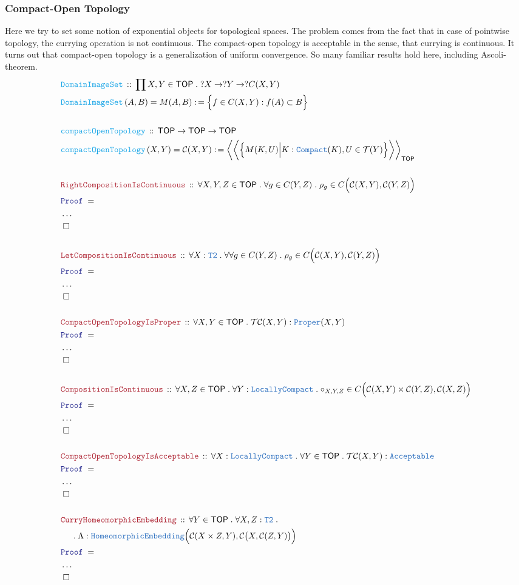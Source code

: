 \documentclass[12pt]{scrartcl}
\newcommand{\TYPE}[1]{\textcolor{NavyBlue}{\mathtt{#1}}}
\newcommand{\FUNC}[1]{\textcolor{Cerulean}{\mathtt{#1}}}
\newcommand{\LOGIC}[1]{\textcolor{Blue}{\mathtt{#1}}}
\newcommand{\THM}[1]{\textcolor{Maroon}{\mathtt{#1}}}
\renewcommand{\.}{\; . \;}
\newcommand{\de}{: \kern 0.1pc =}
\newcommand{\Act}[1]{\left( #1 \right)}
\newcommand{\Theorem}[2]{& \THM{#1} \, :: \, #2 \\ & \Proof = \\ }
\newcommand{\DeclareFunc}[2]{& \FUNC{#1} \, :: \, #2 \\}
\newcommand{\DefineNamedFunc}[4]{&  \FUNC{#1}\Act{#2} = #3 \de #4 \\}
\newcommand{\NewLine}{\\ & \kern 1pc}
\newcommand{\Page}[1]{ \begin{align*} #1 \end{align*}   }
\newcommand{\NoProof}{ & \ldots \\ \EndProof}
\newcommand{\QED}{\; \square}
\newcommand{\EndProof}{& \QED \\}
\newcommand{\Proof}{\LOGIC{Proof} \; }
\newcommand{\C}{\mathcal{C}}
\newcommand{\TOP}{\mathsf{TOP}}
\newcommand{\T}{\mathcal{T}}
\begin{document}
\subsubsection{Compact-Open Topology}
Here we try to set some notion of exponential objects for topological spaces.
The problem comes from the fact that in case of pointwise topology,
the currying operation is not continuous.
The compact-open topology is acceptable in the sense,
that currying is continuous.
It turns out that compact-open topology is a generalization of uniform convergence.
So many familiar results hold here, including Ascoli-theorem.
\Page{
	\DeclareFunc{DomainImageSet}{ \prod X,Y \in \TOP \. ?X \to ?Y \to ?C(X,Y)}
	\DefineNamedFunc{DomainImageSet}{A,B}{M(A,B)}{\Big\{f \in C(X,Y) : f(A) \subset B \Big\}}
	\\
	\DeclareFunc{compactOpenTopology}{\TOP \to \TOP \to \TOP}
	\DefineNamedFunc{compactOpenTopology}{X,Y}{\C(X,Y)}
	{ \bigg\langle\bigg\langle\Big\{ M(K,U) \Big| K : \TYPE{Compact}(K), U \in \T(Y) \Big\}\bigg\rangle\bigg\rangle_\TOP}
	\\
	\Theorem{RightCompositionIsContinuous}
	{
		\forall X,Y,Z \in \TOP \.
		\forall g \in C(Y,Z) \.
		\rho_g \in C\Big( \C(X,Y),\C(Y,Z) \Big)
	}
	\NoProof
	\\
	\Theorem{LetCompositionIsContinuous}
	{
		\forall X  : \TYPE{T2}  \.
		\forall 
		\forall g \in C(Y,Z) \.
		\rho_g \in C\Big( \C(X,Y),\C(Y,Z) \Big)
	}
	\NoProof
	\\
	\Theorem{CompactOpenTopologyIsProper}
	{
		\forall X,Y \in \TOP \.
		\T\C(X,Y) : \TYPE{Proper}(X,Y)
	}
	\NoProof
	\\
	\Theorem{CompositionIsContinuous}
	{
		\forall X,Z \in \TOP \.
		\forall Y  :\TYPE{LocallyCompact} \.
		\circ_{X,Y,Z} \in C\Big( \C(X,Y) \times \C(Y,Z), \C(X,Z) \Big)
	}
	\NoProof
	\\
	\Theorem{CompactOpenTopologyIsAcceptable}
	{
		\forall X : \TYPE{LocallyCompact} \.
		\forall Y \in \TOP \.
		\T\C(X,Y) : \TYPE{Acceptable}
	}
	\NoProof
	\\
	\Theorem{CurryHomeomorphicEmbedding}
	{
		\forall Y \in \TOP \.
		\forall X,Z : \TYPE{T2} \. \NewLine \. 
		\Lambda : \TYPE{HomeomorphicEmbedding}\Big( \C(X \times Z, Y), \C\big(X,\C(Z,Y)\big) \Big)
	}
	\NoProof
}
\end{document}
